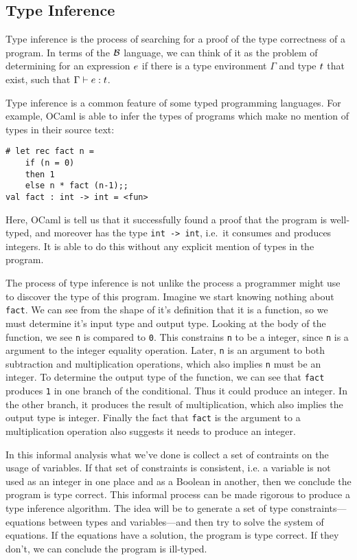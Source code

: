 \subsection{Type Inference}


Type inference is the process of searching for a proof of the type
correctness of a program.  In terms of the $\mathcal{B}$ language, we can
think of it as the problem of determining for an expression $e$ if
there is a type environment $\Gamma$ and type $t$ that exist,
such that ${\Gamma}\vdash{e}:{t}$.

Type inference is a common feature of some typed programming
languages.  For example, OCaml is able to infer the types of programs
which make no mention of types in their source text:
\begin{verbatim}
# let rec fact n =
    if (n = 0)
    then 1
    else n * fact (n-1);;
val fact : int -> int = <fun>
\end{verbatim}
Here, OCaml is tell us that it successfully found a proof that the
program is well-typed, and moreover has the type {\tt int -> int},
i.e.~it consumes and produces integers.  It is able to do this without
any explicit mention of types in the program.

The process of type inference is not unlike the process a programmer
might use to discover the type of this program.  Imagine we start
knowing nothing about {\tt fact}.  We can see from the shape of it's
definition that it is a function, so we must determine it's input type
and output type.  Looking at the body of the function, we see {\tt n}
is compared to {\tt 0}.  This constrains {\tt n} to be a integer,
since {\tt n} is a argument to the integer equality operation.  Later,
{\tt n} is an argument to both subtraction and multiplication
operations, which also implies {\tt n} must be an integer.  To
determine the output type of the function, we can see that {\tt fact}
produces {\tt 1} in one branch of the conditional.  Thus it could
produce an integer.  In the other branch, it produces the result of
multiplication, which also implies the output type is integer.
Finally the fact that {\tt fact} is the argument to a multiplication
operation also suggests it needs to produce an integer.

In this informal analysis what we've done is collect a set of
contraints on the usage of variables.  If that set of constraints is
consistent, i.e. a variable is not used as an integer in one place and
as a Boolean in another, then we conclude the program is type correct.
This informal process can be made rigorous to produce a type inference
algorithm.  The idea will be to generate a set of type
constraints---equations between types and variables---and then try to
solve the system of equations.  If the equations have a solution, the
program is type correct.  If they don't, we can conclude the program
is ill-typed.


